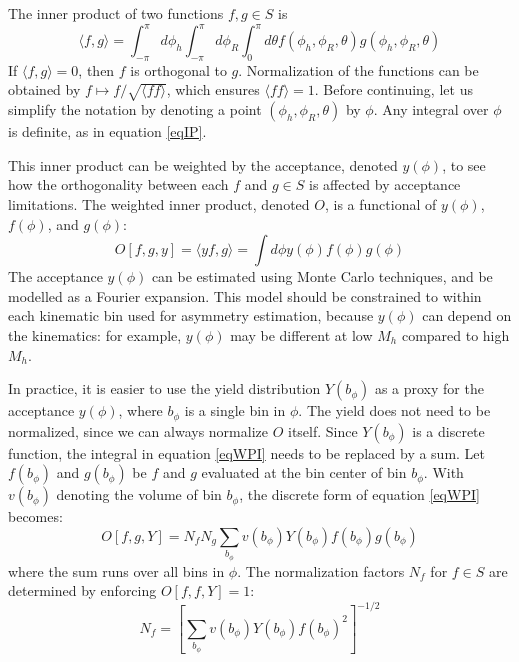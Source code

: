 \documentclass[12pt]{article}
\begin{document}
The inner product of two functions $f,g\in S$ is
\begin{equation}
\langle f,g\rangle=
\int_{-\pi}^{\pi}d\phi_h
\int_{-\pi}^{\pi}d\phi_R
\int_{0}^{\pi}d\theta
f\left(\phi_h,\phi_R,\theta\right)
g\left(\phi_h,\phi_R,\theta\right)
\label{eqIP}
\end{equation}
If $\langle f,g\rangle=0$, then $f$ is orthogonal to $g$. Normalization of the
functions can be obtained by $f\mapsto f/\sqrt{\langle ff\rangle}$, which
ensures $\langle ff\rangle=1$.  
Before continuing, let us simplify the notation by denoting a point
$\left(\phi_h,\phi_R,\theta\right)$ by $\phi$. Any integral over $\phi$ is
definite, as in equation \ref{eqIP}.

This inner product can be weighted by the acceptance, denoted $y(\phi)$, to see how the
orthogonality between each $f$ and $g\in S$ is affected by acceptance
limitations. The weighted inner product, denoted $O$,
is a functional of $y(\phi)$, $f(\phi)$, and $g(\phi)$:
\begin{equation}
O\left[f,g,y\right]=\langle yf,g\rangle=\int{d\phi y(\phi)f(\phi)g(\phi)}
\label{eqWPI}
\end{equation}
The acceptance $y(\phi)$ can be estimated using Monte Carlo techniques, and be
modelled as a Fourier expansion. This model should be constrained to within each
kinematic bin used for asymmetry estimation, because $y(\phi)$ can depend on the
kinematics: for example, $y(\phi)$ may be different at low $M_h$ compared to
high $M_h$.

In practice, it is easier to use the yield distribution $Y(b_\phi)$ as a proxy for the
acceptance $y(\phi)$, where $b_\phi$ is a single bin in $\phi$. The yield does
not need to be normalized, since we can always normalize $O$ itself. Since
$Y(b_\phi)$ is a discrete function, the integral in equation \ref{eqWPI} needs
to be replaced by a sum. Let $f(b_\phi)$ and $g(b_\phi)$ be $f$ and $g$
evaluated at the bin center of bin $b_\phi$. With $v(b_\phi)$ denoting the volume of
bin $b_\phi$, the discrete form of equation \ref{eqWPI} becomes:
\begin{equation}
\displaystyle
O[f,g,Y]=N_fN_g\sum_{b_\phi}{
  v(b_\phi)Y(b_\phi)f(b_\phi)g(b_\phi)
}
\end{equation}
where the sum runs over all bins in $\phi$.
The normalization factors $N_f$ for $f\in S$ are determined by enforcing
$O[f,f,Y]=1$:
\begin{equation}
\displaystyle
N_f=\left[\sum_{b_\phi}{
  v(b_\phi)Y(b_\phi)f(b_\phi)^2
}\right]^{-1/2}
\end{equation}
\end{document}
